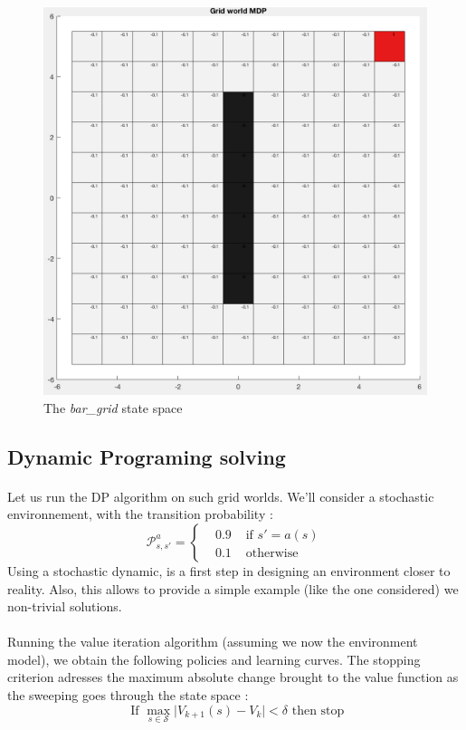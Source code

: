 \documentclass[a4paper]{report}
\begin{document}
{{\begin{figure}[ht!]
\begin{minipage}{0.4\linewidth}
					\includegraphics[width=\linewidth]{bar_grid}
					\caption{The \emph{bar\_grid} state space}
				\end{minipage}
			\end{figure}
			\subsection{Dynamic Programing solving}
			{
				\paragraph{} Let us run the DP algorithm on such grid worlds. We'll consider a stochastic environnement, with the transition probability : 
				\begin{equation}
					\mathcal{P}_{s,s'}^a = \left\{\begin{aligned} &0.9 &\text{ if }s' = a(s) \\ &0.1 &\text{ otherwise} \end{aligned}\right.
				\end{equation}
				Using a stochastic dynamic, is a first step in designing an environment closer to reality. Also, this allows to provide a simple example (like the one considered) we non-trivial solutions. 
				\paragraph{} Running the value iteration algorithm (assuming we now the environment model), we obtain the following policies and learning curves. The stopping criterion adresses the maximum absolute change brought to the value function as the sweeping goes through the state space : 
				\begin{equation}
					\text{ If } \max_{s\in\mathcal{S}} \vert V_{k+1}(s) - V_k \vert < \delta \text{ then stop}
				\end{equation}
				
}}}
\end{document}
